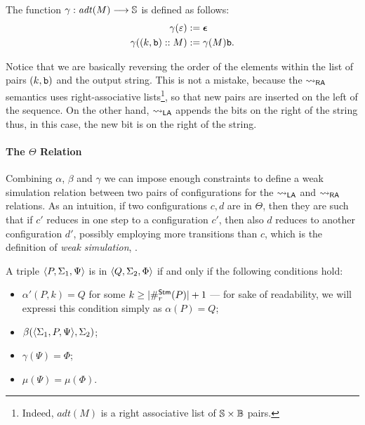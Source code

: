 \begin{defn}
  \label{def:gamma}
  The function $\gamma  :\mathit{adt}(M)\longrightarrow \mathbb{S}$ is defined as follows:
  \begin{align*}
    \gamma(\varepsilon)&:= \bm{\epsilon}\\
    \gamma((k, \mathtt{b})::M)&:=\gamma(M)\mathtt{b}.
  \end{align*}
\end{defn}
\noindent
Notice that we are basically reversing the order of the elements
within the list of pairs $(k, \mathtt{b})$ and the output string. This is
not a mistake, because the ${\leadsto_{\mathsf{RA}}}$ semantics uses right-associative
lists\footnote{Indeed, $\mathit{adt}(M)$ is a right associative list
of $\mathbb{S} \times \mathbb{B}$ pairs.},
so that new pairs are inserted on the left of the sequence.
On the other hand, ${\leadsto_{\mathsf{LA}}}$ appends the bits on the right of the string thus,
in this case,
the new bit is on the right of the string.

\paragraph*{The $\Theta$ Relation}

Combining $\alpha$, $\beta$ and $\gamma$ we can impose enough
constraints to define a weak simulation relation between two pairs of configurations
for the ${\leadsto_{\mathsf{LA}}}$ and ${\leadsto_{\mathsf{RA}}}$ relations. As an intuition,
if two configurations $c, d$ are in $\Theta$, then they are such that if
$c'$ reduces in one step to a configuration $c'$, then also $d$ reduces to
another configuration $d'$, possibly employing more transitions than $c$, which
is the definition of \emph{weak simulation}, \cite{bob}.

\begin{defn}
  \label{def:theta}
A triple $\langle P, \Sigma_1, \Psi\rangle$ is in
$\langle Q, \Sigma_2, \Phi\rangle$ if and only if the following conditions hold:
\begin{itemize}
  \item $\alpha'(P, k) = Q$ for some $k\ge {|\#_r^{\mathsf{Stm}}(P)|+1}$ --- for sake of readability, we will expressi this condition simply as $\alpha(P)=Q$;
  \item $\beta(\langle\Sigma_1, P, \Psi\rangle, \Sigma_2)$;
  \item $\gamma(\Psi) = \Phi$;
  \item $\mu(\Psi) = \mu(\Phi)$.
\end{itemize}
\end{defn}

